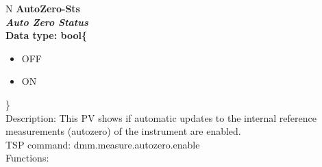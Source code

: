 \documentclass[openany]{article}
\begin{document}
		\begin{tabular}{N}
			\hline
			\bfseries AutoZero-Sts\label{pv:autozero-sts} \\ \hline
			\emph{Auto Zero Status} \\
			Data type: bool\{\begin{itemize}[noitemsep]
				\small
				\item[] OFF
				\item[] ON
			\end{itemize}\} \\
			Description: This PV shows if automatic updates to the internal reference measurements (autozero) of the instrument are enabled. \\
			TSP command: dmm.measure.autozero.enable \\
			Functions: \\
			\arrayrulecolor{\FuncTableBorderColor}

		\end{tabular}
\end{document}
